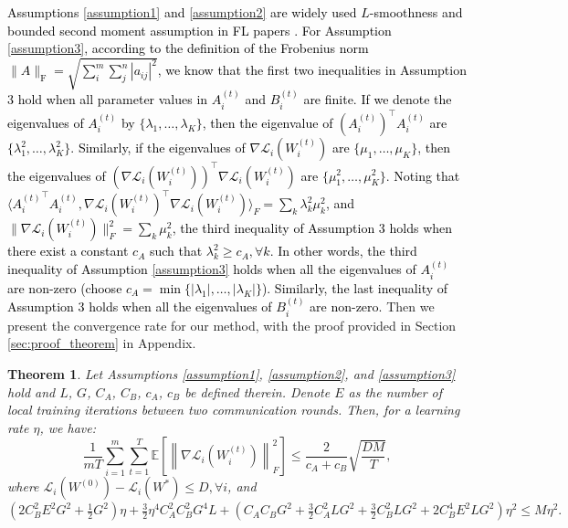 \documentclass{article} %
\newtheorem{theorem}{Theorem}
\newtheorem{assumption}{Assumption}
\newcommand{\pengxin}[1]{\textcolor{black}{#1}}
\begin{document}

    \pengxin{Assumptions \ref{assumption1} and \ref{assumption2} are widely used $L$-smoothness and bounded second moment assumption in FL papers \citep{li2019convergence,yu2019parallel,basu2019qsparse}. For Assumption \ref{assumption3}, according to the definition of the Frobenius norm $\|A\|_{\mathrm{F}}=\sqrt{\sum_i^m \sum_j^n\left|a_{i j}\right|^2}$, we know that the first two inequalities in Assumption 3 hold when all parameter values in $A_i^{(t)}$ and $B_i^{(t)}$ are finite. If we denote the eigenvalues of $A_i^{(t)}$ by $\{\lambda_{1},\ldots,\lambda_{K}\}$, then the eigenvalue of $(A_i^{(t)})^{\top} A_i^{(t)}$ are $\{\lambda^2_{1},\ldots,\lambda^2_{K}\}$. Similarly, if the eigenvalues of $\nabla \mathcal{L}_i(W_i^{(t)})$ are $\{\mu_{1},\ldots,\mu_{K}\}$, then the eigenvalues of $(\nabla \mathcal{L}_i(W_i^{(t)}))^{\top}\nabla \mathcal{L}_i(W_i^{(t)})$ are $\{\mu^2_{1},\ldots,\mu^2_{K}\}$. Noting that $\langle {A_i^{(t)}}^{\top}A_i^{(t)}, \nabla \mathcal{L}_i(W_i^{(t)})^{\top}\nabla \mathcal{L}_i(W_i^{(t)})\rangle_F = \sum_{k}\lambda_k^2 \mu_k^2$, and $\|\nabla \mathcal{L}_i(W_i^{(t)})\|_F^2 = \sum_{k}\mu_k^2$, the third inequality of Assumption 3 holds when there exist a constant $c_A$ such that $\lambda_k^2 \geq c_A, \forall k$. In other words, the third inequality of Assumption \ref{assumption3} holds when all the eigenvalues of $A_i^{(t)}$ are non-zero (choose $c_A = \min\{|\lambda_1|,\ldots,|\lambda_K|\}$). Similarly, the last inequality of Assumption 3 holds when all the eigenvalues of $B_i^{(t)}$ are non-zero. }
Then we present the convergence rate for our method, with the proof provided in Section \ref{sec:proof_theorem} in Appendix.
\begin{theorem}
\label{theorem1}
Let Assumptions \ref{assumption1}, \ref{assumption2}, and \ref{assumption3} hold and $L$, $G$, $C_A$, $C_B$, $c_A$, $c_B$ be defined therein. Denote $E$ as the number of local training iterations between two communication rounds. Then, for a learning rate $\eta$, we have:
\begin{equation}
\frac{1}{m T} \sum_{i=1}^m \sum_{t=1}^T \mathbb{E}\left[\left\|\nabla\mathcal{L}_i(W_i^{(t)})\right\|_F^2\right] \leq \frac{2}{c_A+c_B}\sqrt{\frac{DM}{T}},
\end{equation}
where $\mathcal{L}_i(W^{(0)}) - \mathcal{L}_i(W^*) \leq D, \forall i$, and
$
(2C_B^2E^2G^2+\frac{1}{2}G^2)\eta + \frac{3}{2}\eta^4 C_A^2 C_B^2G^4L+(C_A C_B G^2+\frac{3}{2}C_A^2L G^2+\frac{3}{2}C_B^2L G^2+2C_B^4 E^2 L G^2)\eta^2 \leq M\eta^2.
$
\end{theorem} 
\end{document}
